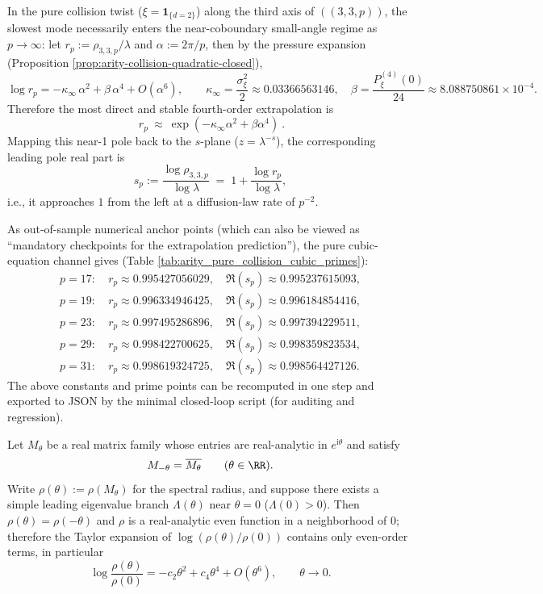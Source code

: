 \begin{remark}\label{rem:arity-335-near-coboundary-scaling}
In the pure collision twist (\(\xi=\mathbf{1}_{\{d=2\}}\)) along the third axis of \(((3,3,p))\),
the slowest mode necessarily enters the near-coboundary small-angle regime as \(p\to\infty\):
let
\(
r_p:=\rho_{3,3,p}/\lambda
\)
and \(\alpha:=2\pi/p\), then by the pressure expansion (Proposition \ref{prop:arity-collision-quadratic-closed}),
\[
\log r_p=-\kappa_\infty\,\alpha^2+\beta\,\alpha^4+O(\alpha^6),
\qquad
\kappa_\infty=\frac{\sigma_\xi^2}{2}\approx 0.03366563146,
\quad
\beta=\frac{P_\xi^{(4)}(0)}{24}\approx 8.088750861\times 10^{-4}.
\]
Therefore the most direct and stable fourth-order extrapolation is
\[
\boxed{\ r_p\ \approx\ \exp(-\kappa_\infty\alpha^2+\beta\alpha^4)\ }.
\]
Mapping this near-1 pole back to the \(s\)-plane (\(z=\lambda^{-s}\)), the corresponding leading pole real part is
\[
s_p:=\frac{\log\rho_{3,3,p}}{\log\lambda}
\;=\;
1+\frac{\log r_p}{\log\lambda},
\]
i.e., it approaches \(1\) from the left at a diffusion-law rate of \(p^{-2}\).
\par
As out-of-sample numerical anchor points (which can also be viewed as ``mandatory checkpoints for the extrapolation prediction''), the pure cubic-equation channel gives (Table \ref{tab:arity_pure_collision_cubic_primes}):
\[
\begin{aligned}
p=17:&\ r_p\approx 0.995427056029,\quad \Re(s_p)\approx 0.995237615093,\\
p=19:&\ r_p\approx 0.996334946425,\quad \Re(s_p)\approx 0.996184854416,\\
p=23:&\ r_p\approx 0.997495286896,\quad \Re(s_p)\approx 0.997394229511,\\
p=29:&\ r_p\approx 0.998422700625,\quad \Re(s_p)\approx 0.998359823534,\\
p=31:&\ r_p\approx 0.998619324725,\quad \Re(s_p)\approx 0.998564427126.
\end{aligned}
\]
The above constants and prime points can be recomputed in one step and exported to JSON by the minimal closed-loop script  (for auditing and regression).
\end{remark}


\begin{remark}\label{lem:unit-circle-evenness}
Let $M_\theta$ be a real matrix family whose entries are real-analytic in $e^{\mathrm{i}\theta}$ and satisfy
\[
M_{-\theta}=\overline{M_\theta}\qquad(\theta\in\RR).
\]
Write $\rho(\theta):=\rho(M_\theta)$ for the spectral radius, and suppose there exists a simple leading eigenvalue branch $\Lambda(\theta)$ near $\theta=0$ ($\Lambda(0)>0$).
Then \(\rho(\theta)=\rho(-\theta)\) and \(\rho\) is a real-analytic even function in a neighborhood of \(0\); therefore the Taylor expansion of \(\log(\rho(\theta)/\rho(0))\) contains only even-order terms, in particular
\[
\log\frac{\rho(\theta)}{\rho(0)}=-c_2\theta^2+c_4\theta^4+O(\theta^6),
\qquad \theta\to 0.
\]
\end{remark}

